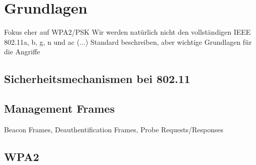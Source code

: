 \section{Grundlagen}
Fokus eher auf WPA2/PSK
Wir werden natürlich nicht den vollständigen IEEE 802.11a, b, g, n und ac (...) Standard beschreiben, aber wichtige Grundlagen für die Angriffe
\subsection{Sicherheitsmechanismen bei 802.11}

\subsection{Management Frames}
Beacon Frames, Deauthentification Frames, Probe Requests/Responses

\subsection{WPA2}